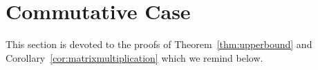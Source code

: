 \documentclass[11pt,letterpaper]{article}
\newtheorem{theorem}{Theorem}
\begin{document}





%
%
%
%
%
%

\section{Commutative Case}\label{sec-commutative}
This section is devoted to the proofs of Theorem~\ref{thm:upperbound} and Corollary~\ref{cor:matrixmultiplication}
which we remind below.

\upperthm*

\matrixmultcor*
\end{document}
